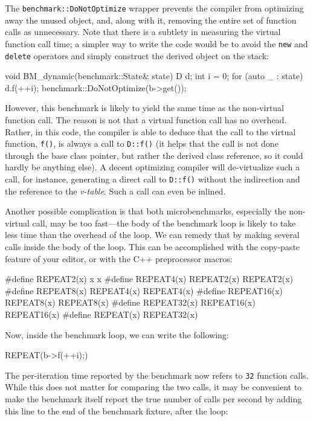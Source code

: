 The \texttt{benchmark::DoNotOptimize} wrapper prevents the compiler from optimizing away the unused object, and, along with it, removing the entire set of function calls as unnecessary. Note that there is a subtlety in measuring the virtual function call time; a simpler way to write the code would be to avoid the \texttt{new} and \texttt{delete} operators and simply construct the derived object on the stack:

\begin{code}
void BM_dynamic(benchmark::State& state) {
  D d;
  int i = 0;
  for (auto _ : state) d.f(++i);
  benchmark::DoNotOptimize(b->get());
}
\end{code}

However, this benchmark is likely to yield the same time as the non-virtual function call. The reason is not that a virtual function call has no overhead. Rather, in this code, the compiler is able to deduce that the call to the virtual function, \texttt{f()}, is always a call to \texttt{D::f()} (it helps that the call is not done through the base class pointer, but rather the derived class reference, so it could hardly be anything else). A decent optimizing compiler will de-virtualize such a call, for instance, generating a direct call to \texttt{D::f()} without the indirection and the reference to the \emph{v-table}. Such a call can even be inlined.

Another possible complication is that both microbenchmarks, especially the non-virtual call, may be too fast---the body of the benchmark loop is likely to take less time than the overhead of the loop. We can remedy that by making several calls inside the body of the loop. This can be accomplished with the copy-paste feature of your editor, or with the C++ preprocessor macros:

\begin{code}
#define REPEAT2(x) x x
#define REPEAT4(x) REPEAT2(x) REPEAT2(x)
#define REPEAT8(x) REPEAT4(x) REPEAT4(x)
#define REPEAT16(x) REPEAT8(x) REPEAT8(x)
#define REPEAT32(x) REPEAT16(x) REPEAT16(x)
#define REPEAT(x) REPEAT32(x)
\end{code}

Now, inside the benchmark loop, we can write the following:

\begin{code}
REPEAT(b->f(++i);)
\end{code}

The per-iteration time reported by the benchmark now refers to \texttt{32} function calls. While this does not matter for comparing the two calls, it may be convenient to make the benchmark itself report the true number of calls per second by adding this line to the end of the benchmark fixture, after the loop:


